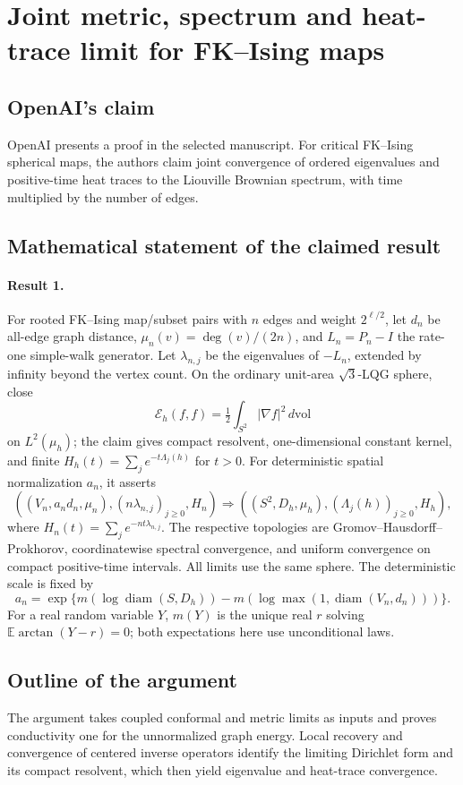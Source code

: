\documentclass[11pt]{article}
\begin{document}
\section*{Joint metric, spectrum and heat-trace limit for FK–Ising maps}

\subsection{OpenAI's claim}
OpenAI presents a proof in the selected manuscript. For critical FK--Ising spherical maps, the authors claim joint convergence of ordered eigenvalues and positive-time heat traces to the Liouville Brownian spectrum, with time multiplied by the number of edges.

\subsection{Mathematical statement of the claimed result}
\paragraph{Result 1.} For rooted FK--Ising map/subset pairs with \(n\) edges and weight \(2^{\ell/2}\), let \(d_n\) be all-edge graph distance, \(\mu_n(v)=\deg(v)/(2n)\), and \(L_n=P_n-I\) the rate-one simple-walk generator. Let \(\lambda_{n,j}\) be the eigenvalues of \(-L_n\), extended by infinity beyond the vertex count. On the ordinary unit-area \(\sqrt3\)-LQG sphere, close
\[
 \mathcal E_h(f,f)=\tfrac12\int_{S^2}|\nabla f|^2\,d\mathrm{vol}
\]
on \(L^2(\mu_h)\); the claim gives compact resolvent, one-dimensional constant kernel, and finite \(H_h(t)=\sum_je^{-t\Lambda_j(h)}\) for \(t>0\). For deterministic spatial normalization \(a_n\), it asserts
\[
 ((V_n,a_nd_n,\mu_n),(n\lambda_{n,j})_{j\ge0},H_n)
 \Longrightarrow((S^2,D_h,\mu_h),(\Lambda_j(h))_{j\ge0},H_h),
\]
where \(H_n(t)=\sum_je^{-nt\lambda_{n,j}}\). The respective topologies are Gromov--Hausdorff--Prokhorov, coordinatewise spectral convergence, and uniform convergence on compact positive-time intervals. All limits use the same sphere. The deterministic scale is fixed by
\[
 a_n=\exp\{m(\log\operatorname{diam}(S,D_h))-m(\log\max(1,\operatorname{diam}(V_n,d_n)))\}.
\]
For a real random variable $Y$, $m(Y)$ is the unique real $r$ solving $\mathbb E\arctan(Y-r)=0$; both expectations here use unconditional laws.

\subsection{Outline of the argument}
The argument takes coupled conformal and metric limits as inputs and proves conductivity one for the unnormalized graph energy. Local recovery and convergence of centered inverse operators identify the limiting Dirichlet form and its compact resolvent, which then yield eigenvalue and heat-trace convergence.
\end{document}
